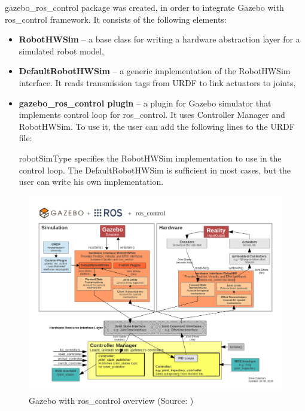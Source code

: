 \documentclass[english,inz,shortabstract]{iithesis}
\begin{document}
    \textsf{gazebo\_ros\_control} package was created, in order to integrate Gazebo with \textsf{ros\_control} framework. It consists of the following elements:
    \begin{itemize}
        \item \textbf{RobotHWSim} -- a base class for writing a hardware abstraction layer for a simulated robot model,
        \item \textbf{DefaultRobotHWSim} -- a generic implementation of the RobotHWSim interface. It reads transmission tags from URDF to link actuators to joints,
        \item \textbf{gazebo\_ros\_control plugin} -- a plugin for Gazebo simulator that implements control loop for ros\_control. It uses Controller Manager and RobotHWSim. To use it, the user can add the following lines to the URDF file:
        
        \textsf{robotSimType} specifies the RobotHWSim implementation to use in the control loop. The \mbox{DefaultRobotHWSim} is sufficient in most cases, but the user can write his own implementation.
    \end{itemize}

    \begin{figure}[ht]
        \centering
        \includegraphics[width=\textwidth]{img/gazebo_control.png}
        \caption{Gazebo with ros\_control overview (Source: \cite{gazebo:ros_control})}
        \label{fig:gazebo_control}
    \end{figure}

\pagebreak
\end{document}
